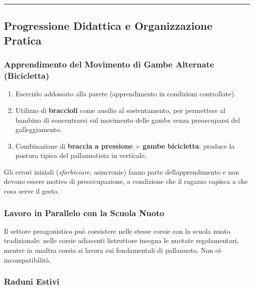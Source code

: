 \documentclass[a4paper,11pt]{article}
\providecommand{\tightlist}{%
  \setlength{\itemsep}{0pt}\setlength{\parskip}{0pt}}
\begin{document}
\begin{center}\rule{0.5\linewidth}{0.5pt}\end{center}

\subsection{Progressione Didattica e Organizzazione
      Pratica}\label{progressione-didattica-e-organizzazione-pratica}

\subsubsection{Apprendimento del Movimento di Gambe Alternate
      (Bicicletta)}\label{apprendimento-del-movimento-di-gambe-alternate-bicicletta}

\begin{enumerate}
      \tightlist
      \item
            Esercizio addossato alla parete (apprendimento in condizioni
            controllate).
      \item
            Utilizzo di \textbf{braccioli} come ausilio al sostentamento, per
            permettere al bambino di concentrarsi sul movimento delle gambe senza
            preoccuparsi del galleggiamento.
      \item
            Combinazione di \textbf{braccia a pressione} + \textbf{gambe
                  bicicletta}: produce la postura tipica del pallanuotista in verticale.
\end{enumerate}

Gli errori iniziali (\emph{sforbiciare}, asincronie) fanno parte
dell\textquotesingle apprendimento e non devono essere motivo di
preoccupazione, a condizione che il ragazzo capisca a che cosa serve il
gesto.

\subsubsection{Lavoro in Parallelo con la Scuola
      Nuoto}\label{lavoro-in-parallelo-con-la-scuola-nuoto}

Il settore preagonistico può coesistere nelle stesse corsie con la
scuola nuoto tradizionale: nelle corsie adiacenti
l\textquotesingle istruttore insegna le nuotate regolamentari, mentre in
un\textquotesingle altra corsia si lavora sui fondamentali di
pallanuoto. Non c\textquotesingle è incompatibilità.

\subsubsection{Raduni Estivi}\label{raduni-estivi}
\end{document}
